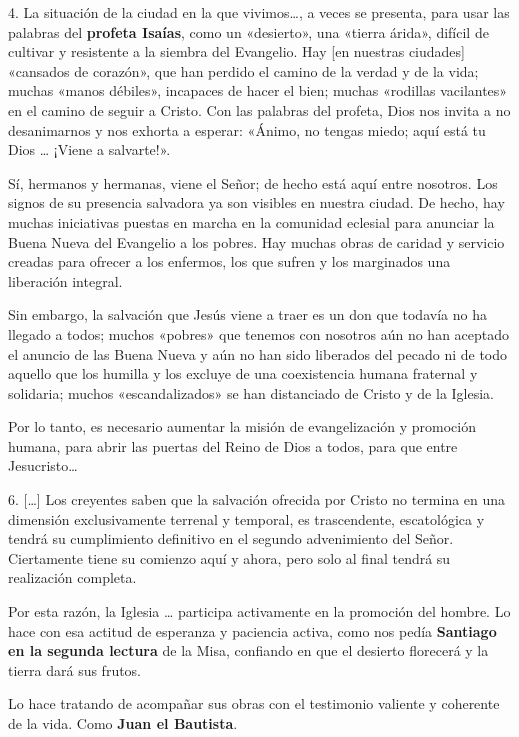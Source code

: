 \documentclass[]{article}
\begin{document}
4. La situación de la ciudad en la que vivimos\ldots{}, a veces se
presenta, para usar las palabras del \textbf{profeta Isaías}, como un
«desierto», una «tierra árida», difícil de cultivar y resistente a la
siembra del Evangelio. Hay {[}en nuestras ciudades{]} «cansados de
corazón», que han perdido el camino de la verdad y de la vida; muchas
«manos débiles», incapaces de hacer el bien; muchas «rodillas
vacilantes» en el camino de seguir a Cristo. Con las palabras del
profeta, Dios nos invita a no desanimarnos y nos exhorta a esperar:
«Ánimo, no tengas miedo; aquí está tu Dios \ldots{} ¡Viene a salvarte!».

Sí, hermanos y hermanas, viene el Señor; de hecho está aquí entre
nosotros. Los signos de su presencia salvadora ya son visibles en
nuestra ciudad. De hecho, hay muchas iniciativas puestas en marcha en la
comunidad eclesial para anunciar la Buena Nueva del Evangelio a los
pobres. Hay muchas obras de caridad y servicio creadas para ofrecer a
los enfermos, los que sufren y los marginados una liberación integral.

Sin embargo, la salvación que Jesús viene a traer es un don que todavía
no ha llegado a todos; muchos «pobres» que tenemos con nosotros aún no
han aceptado el anuncio de las Buena Nueva y aún no han sido liberados
del pecado ni de todo aquello que los humilla y los excluye de una
coexistencia humana fraternal y solidaria; muchos «escandalizados» se
han distanciado de Cristo y de la Iglesia.

Por lo tanto, es necesario aumentar la misión de evangelización y
promoción humana, para abrir las puertas del Reino de Dios a todos, para
que entre Jesucristo\ldots{}

6. {[}\ldots{}{]} Los creyentes saben que la salvación ofrecida por
Cristo no termina en una dimensión exclusivamente terrenal y temporal,
es trascendente, escatológica y tendrá su cumplimiento definitivo en el
segundo advenimiento del Señor. Ciertamente tiene su comienzo aquí y
ahora, pero solo al final tendrá su realización completa.

Por esta razón, la Iglesia \ldots{} participa activamente en la
promoción del hombre. Lo hace con esa actitud de esperanza y paciencia
activa, como nos pedía \textbf{Santiago en la segunda lectura} de la
Misa, confiando en que el desierto florecerá y la tierra dará sus
frutos.

Lo hace tratando de acompañar sus obras con el testimonio valiente y
coherente de la vida. Como \textbf{Juan el Bautista}.
\end{document}
